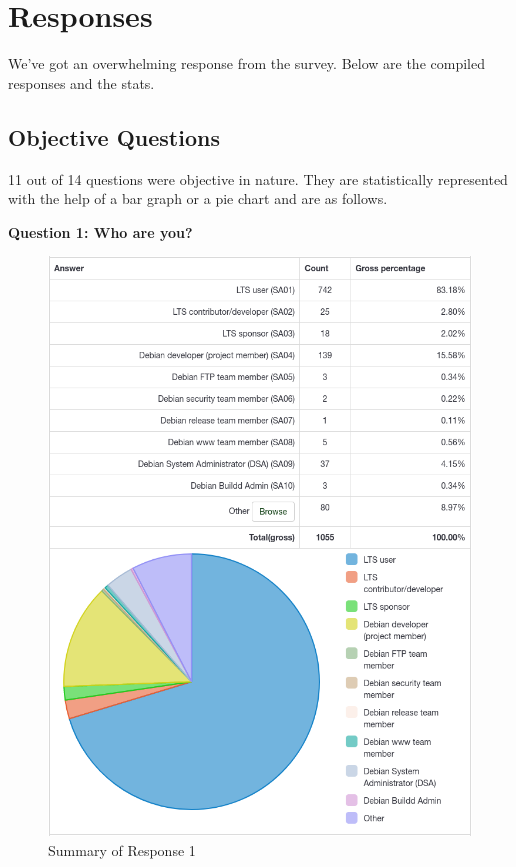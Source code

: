 \documentclass{article}
\begin{document}
\vspace{3mm}
\section{Responses}

\vspace{3mm}
We've got an overwhelming response from the survey. Below are the compiled responses and the stats.

\vspace{3mm}
\subsection{Objective Questions}

\vspace{3mm}
11 out of 14 questions were objective in nature. They are statistically represented with the help
of a bar graph or a pie chart and are as follows.

\newpage

\Large{\textbf{Question 1: Who are you?}}

\vspace{3mm}
\begin{figure}[h!]
\centering
\includegraphics[width=15.8cm]{assets/1-complete-responses.png}
\caption{Summary of Response 1}
\end{figure}
\end{document}
